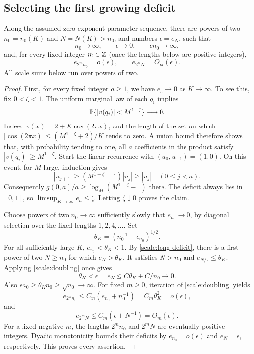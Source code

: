 \subsection{Selecting the first growing deficit}

\begin{lemma}\label{scale:selection}
Along the assumed zero-exponent parameter sequence, there are powers
of two $n_0=n_0(K)$ and $N=N(K)>n_0$, and numbers $\epsilon=e_N$,
such that
\begin{equation}\label{scale:selected-limits}
 n_0\to\infty,\qquad \epsilon\to0,\qquad
 \epsilon n_0\to\infty,
\end{equation}
and, for every fixed integer $m\in\mathbb{Z}$ (once the lengths below are
positive integers),
\begin{equation}\label{scale:selected-boundaries}
 e_{2^m n_0}=o(\epsilon),\qquad
 e_{2^m N}=O_m(\epsilon).
\end{equation}
All scale sums below run over powers of two.
\end{lemma}

\begin{proof}
First, for every fixed integer $a\ge1$, we have $e_a\to0$ as
$K\to\infty$. To see this, fix $0<\zeta<1$. The uniform marginal
law of each $q_i$ implies
\[
 \mathbb{P}\{|v(q_i)|<M^{1-\zeta}\}\longrightarrow0.
\]
Indeed $v(x)=2+K\cos(2\pi x)$, and the length of the set on which
$|\cos(2\pi x)|\le(M^{1-\zeta}+2)/K$ tends to zero. A union bound
therefore shows that, with probability tending to one, all $a$
coefficients in the product satisfy $|v(q_i)|\ge M^{1-\zeta}$.
Start the linear recurrence with $(u_0,u_{-1})=(1,0)$. On this event,
for $M$ large, induction gives
\[
 |u_{j+1}|\ge(M^{1-\zeta}-1)|u_j|\ge|u_j|
 \quad(0\le j<a).
\]
Consequently $g(0,a)/a\ge\log_M(M^{1-\zeta}-1)$ there.
The deficit always lies in $[0,1]$, so
$\limsup_{K\to\infty}e_a\le\zeta$. Letting $\zeta\downarrow0$
proves the claim.

Choose powers of two $n_0\to\infty$ sufficiently slowly that
$e_{n_0}\to0$, by diagonal selection over the fixed lengths
$1,2,4,\ldots$. Set
\[
 \theta_K=(n_0^{-1}+e_{n_0})^{1/2}.
\]
For all sufficiently large $K$, $e_{n_0}<\theta_K<1$.
By \cref{scale:long-deficit}, there is a first power of two
$N\ge n_0$ for which $e_N>\theta_K$. It satisfies $N>n_0$ and
$e_{N/2}\le\theta_K$. Applying \cref{scale:doubling} once gives
\[
 \theta_K<\epsilon=e_N\le C\theta_K+C/n_0\longrightarrow0.
\]
Also $\epsilon n_0\ge\theta_K n_0\ge\sqrt{n_0}\to\infty$.
For fixed $m\ge0$, iteration of \cref{scale:doubling} yields
\[
 e_{2^m n_0}\le C_m(e_{n_0}+n_0^{-1})
 =C_m\theta_K^2=o(\epsilon),
\]
and
\[
 e_{2^m N}\le C_m(\epsilon+N^{-1})=O_m(\epsilon).
\]
For a fixed negative $m$, the lengths $2^m n_0$ and $2^mN$ are
eventually positive integers. Dyadic monotonicity bounds their
deficits by $e_{n_0}=o(\epsilon)$ and $e_N=\epsilon$, respectively.
This proves every assertion.
\end{proof}

